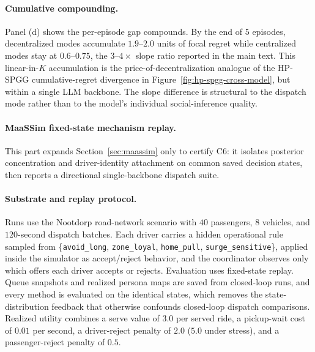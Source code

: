 \paragraph{Cumulative compounding.} Panel (d) shows the per-episode gap compounds. By the end of $5$ episodes, decentralized modes accumulate $1.9$--$2.0$ units of focal regret while centralized modes stay at $0.6$--$0.75$, the $3$--$4\times$ slope ratio reported in the main text. This linear-in-$K$ accumulation is the price-of-decentralization analogue of the HP-SPGG cumulative-regret divergence in Figure~\ref{fig:hp-spgg-cross-model}, but within a single LLM backbone. The slope difference is structural to the dispatch mode rather than to the model's individual social-inference quality.

\paragraph{MaaSSim fixed-state mechanism replay.}
\label{app:maassim}

This part expands Section~\ref{sec:maassim} only to certify C6: it isolates posterior concentration and driver-identity attachment on common saved decision states, then reports a directional single-backbone dispatch suite.

\paragraph{Substrate and replay protocol.}
Runs use the Nootdorp road-network scenario with $40$ passengers, $8$ vehicles, and $120$-second dispatch batches. Each driver carries a hidden operational rule sampled from \{\texttt{avoid\_long}, \texttt{zone\_loyal}, \texttt{home\_pull}, \texttt{surge\_sensitive}\}, applied inside the simulator as accept/reject behavior, and the coordinator observes only which offers each driver accepts or rejects. Evaluation uses fixed-state replay. Queue snapshots and realized persona maps are saved from closed-loop runs, and every method is evaluated on the identical states, which removes the state-distribution feedback that otherwise confounds closed-loop dispatch comparisons. Realized utility combines a serve value of $3.0$ per served ride, a pickup-wait cost of $0.01$ per second, a driver-reject penalty of $2.0$ ($5.0$ under stress), and a passenger-reject penalty of $0.5$.


